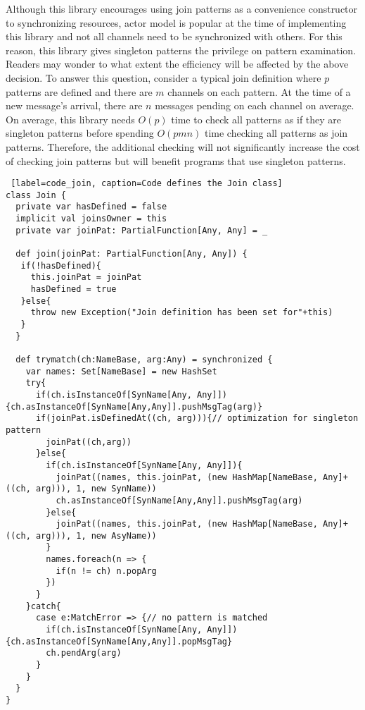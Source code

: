 Although this library encourages using join patterns as a convenience constructor to synchronizing resources, actor model is popular at the time of implementing this library and not all channels need to be synchronized with others.  For this reason, this library gives singleton patterns the privilege on pattern examination.  Readers may wonder to what extent the efficiency will be affected by the above decision.  To answer this question, consider a typical join definition where $p$ patterns are defined and there are $m$ channels on each pattern.  At the time of a new message's arrival, there are $n$ messages pending on each channel on average.  On average, this library needs $O(p)$ time to check all patterns as if they are singleton patterns before spending $O(pmn)$ time checking all patterns as join patterns.  Therefore, the additional checking will not significantly increase the cost of checking join patterns but will benefit programs that use singleton patterns.

\begin{lstlisting} [label=code_join, caption=Code defines the Join class]
class Join {
  private var hasDefined = false
  implicit val joinsOwner = this
  private var joinPat: PartialFunction[Any, Any] = _

  def join(joinPat: PartialFunction[Any, Any]) { 
   if(!hasDefined){
     this.joinPat = joinPat
     hasDefined = true
   }else{
     throw new Exception("Join definition has been set for"+this)
   }
  }
   
  def trymatch(ch:NameBase, arg:Any) = synchronized {
    var names: Set[NameBase] = new HashSet
    try{
      if(ch.isInstanceOf[SynName[Any, Any]]) {ch.asInstanceOf[SynName[Any,Any]].pushMsgTag(arg)}
      if(joinPat.isDefinedAt((ch, arg))){// optimization for singleton pattern        
        joinPat((ch,arg))
      }else{
        if(ch.isInstanceOf[SynName[Any, Any]]){
          joinPat((names, this.joinPat, (new HashMap[NameBase, Any]+((ch, arg))), 1, new SynName))            
          ch.asInstanceOf[SynName[Any,Any]].pushMsgTag(arg)          
        }else{
          joinPat((names, this.joinPat, (new HashMap[NameBase, Any]+((ch, arg))), 1, new AsyName))
        }
        names.foreach(n => {
          if(n != ch) n.popArg
        })
      }
    }catch{
      case e:MatchError => {// no pattern is matched
        if(ch.isInstanceOf[SynName[Any, Any]]) {ch.asInstanceOf[SynName[Any,Any]].popMsgTag}
        ch.pendArg(arg)
      }
    }
  }
}
\end{lstlisting}

